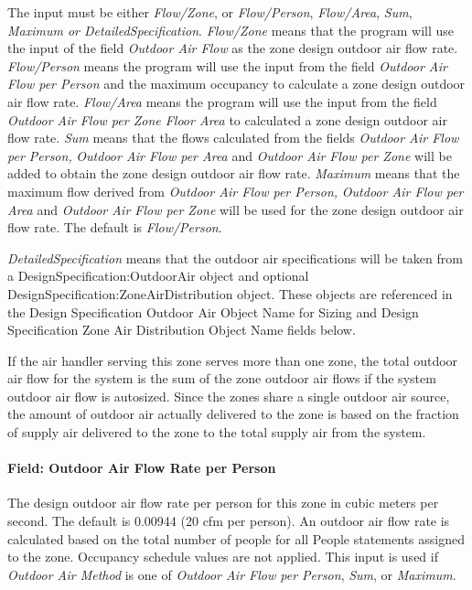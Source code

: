 The input must be either \emph{Flow/Zone}, or \emph{Flow/Person}, \emph{Flow/Area}, \emph{Sum}, \emph{Maximum or DetailedSpecification}. \emph{Flow/Zone} means that the program will use the input of the field \emph{Outdoor Air Flow} as the zone design outdoor air flow rate. \emph{Flow/Person} means the program will use the input from the field \emph{Outdoor Air Flow per Person} and the maximum occupancy to calculate a zone design outdoor air flow rate. \emph{Flow/Area} means the program will use the input from the field \emph{Outdoor Air Flow per Zone Floor Area} to calculated a zone design outdoor air flow rate. \emph{Sum} means that the flows calculated from the fields \emph{Outdoor Air Flow per Person,} \emph{Outdoor Air Flow per Area} and \emph{Outdoor Air Flow per Zone} will be added to obtain the zone design outdoor air flow rate. \emph{Maximum} means that the maximum flow derived from \emph{Outdoor Air Flow per Person,} \emph{Outdoor Air Flow per Area} and \emph{Outdoor Air Flow per Zone} will be used for the zone design outdoor air flow rate. The default is \emph{Flow/Person}.

\emph{DetailedSpecification} means that the outdoor air specifications will be taken from a DesignSpecification:OutdoorAir object and optional DesignSpecification:ZoneAirDistribution object. These objects are referenced in the Design Specification Outdoor Air Object Name for Sizing and Design Specification Zone Air Distribution Object Name fields below.

If the air handler serving this zone serves more than one zone, the total outdoor air flow for the system is the sum of the zone outdoor air flows if the system outdoor air flow is autosized. Since the zones share a single outdoor air source, the amount of outdoor air actually delivered to the zone is based on the fraction of supply air delivered to the zone to the total supply air from the system.

\paragraph{Field: Outdoor Air Flow Rate per Person}\label{field-outdoor-air-flow-rate-per-person-10}

The design outdoor air flow rate per person for this zone in cubic meters per second. The default is 0.00944 (20 cfm per person). An outdoor air flow rate is calculated based on the total number of people for all People statements assigned to the zone. Occupancy schedule values are not applied. This input is used if \emph{Outdoor Air Method} is one of \emph{Outdoor Air Flow per Person}, \emph{Sum}, or \emph{Maximum}.

